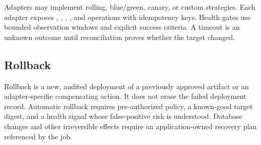 Adapters may implement rolling, blue/green, canary, or custom strategies. Each adapter
exposes , , , , and
 operations with idempotency keys. Health gates use bounded observation
windows and explicit success criteria. A timeout is an unknown outcome until
reconciliation proves whether the target changed.

\subsection{Rollback}

Rollback is a new, audited deployment of a previously approved artifact or an
adapter-specific compensating action. It does not erase the failed deployment record.
Automatic rollback requires pre-authorized policy, a known-good target digest, and a
health signal whose false-positive risk is understood. Database changes and other
irreversible effects require an application-owned recovery plan referenced by the job.

